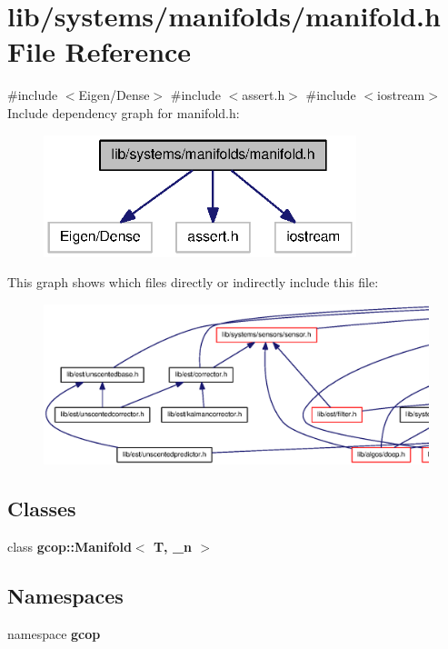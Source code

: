\section{lib/systems/manifolds/manifold.h \-File \-Reference}
\label{manifold_8h}
{\ttfamily \#include $<$\-Eigen/\-Dense$>$}\*
{\ttfamily \#include $<$assert.\-h$>$}\*
{\ttfamily \#include $<$iostream$>$}\*
\-Include dependency graph for manifold.\-h\-:\nopagebreak
\begin{figure}[H]
\begin{center}
\leavevmode
\includegraphics[width=258pt]{manifold_8h__incl}
\end{center}
\end{figure}
\-This graph shows which files directly or indirectly include this file\-:\nopagebreak
\begin{figure}[H]
\begin{center}
\leavevmode
\includegraphics[width=350pt]{manifold_8h__dep__incl}
\end{center}
\end{figure}
\subsection*{\-Classes}
\begin{DoxyCompactItemize}
\item 
class {\bf gcop\-::\-Manifold$<$ T, \-\_\-n $>$}
\end{DoxyCompactItemize}
\subsection*{\-Namespaces}
\begin{DoxyCompactItemize}
\item 
namespace {\bf gcop}
\end{DoxyCompactItemize}
